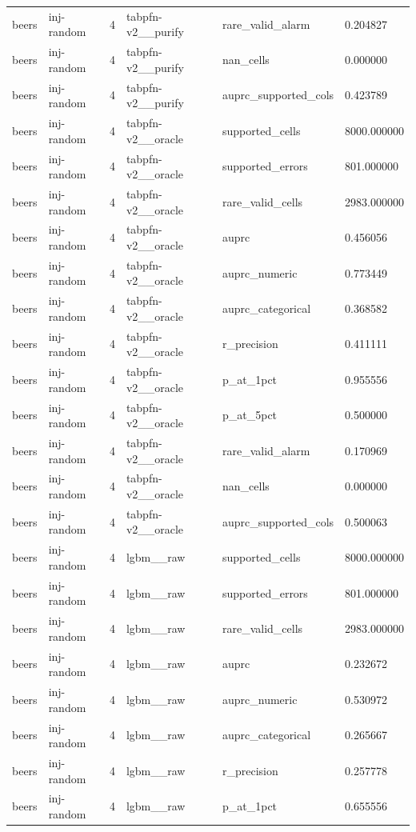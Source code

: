 \begin{tabular}{llllll}
beers & inj-random & 4 & tabpfn-v2\_\_purify & rare\_valid\_alarm & 0.204827 \\
beers & inj-random & 4 & tabpfn-v2\_\_purify & nan\_cells & 0.000000 \\
beers & inj-random & 4 & tabpfn-v2\_\_purify & auprc\_supported\_cols & 0.423789 \\
beers & inj-random & 4 & tabpfn-v2\_\_oracle & supported\_cells & 8000.000000 \\
beers & inj-random & 4 & tabpfn-v2\_\_oracle & supported\_errors & 801.000000 \\
beers & inj-random & 4 & tabpfn-v2\_\_oracle & rare\_valid\_cells & 2983.000000 \\
beers & inj-random & 4 & tabpfn-v2\_\_oracle & auprc & 0.456056 \\
beers & inj-random & 4 & tabpfn-v2\_\_oracle & auprc\_numeric & 0.773449 \\
beers & inj-random & 4 & tabpfn-v2\_\_oracle & auprc\_categorical & 0.368582 \\
beers & inj-random & 4 & tabpfn-v2\_\_oracle & r\_precision & 0.411111 \\
beers & inj-random & 4 & tabpfn-v2\_\_oracle & p\_at\_1pct & 0.955556 \\
beers & inj-random & 4 & tabpfn-v2\_\_oracle & p\_at\_5pct & 0.500000 \\
beers & inj-random & 4 & tabpfn-v2\_\_oracle & rare\_valid\_alarm & 0.170969 \\
beers & inj-random & 4 & tabpfn-v2\_\_oracle & nan\_cells & 0.000000 \\
beers & inj-random & 4 & tabpfn-v2\_\_oracle & auprc\_supported\_cols & 0.500063 \\
beers & inj-random & 4 & lgbm\_\_raw & supported\_cells & 8000.000000 \\
beers & inj-random & 4 & lgbm\_\_raw & supported\_errors & 801.000000 \\
beers & inj-random & 4 & lgbm\_\_raw & rare\_valid\_cells & 2983.000000 \\
beers & inj-random & 4 & lgbm\_\_raw & auprc & 0.232672 \\
beers & inj-random & 4 & lgbm\_\_raw & auprc\_numeric & 0.530972 \\
beers & inj-random & 4 & lgbm\_\_raw & auprc\_categorical & 0.265667 \\
beers & inj-random & 4 & lgbm\_\_raw & r\_precision & 0.257778 \\
beers & inj-random & 4 & lgbm\_\_raw & p\_at\_1pct & 0.655556 \\

\end{tabular}
